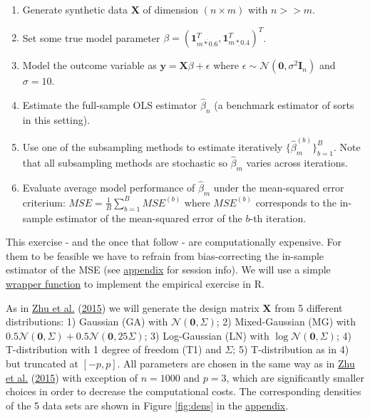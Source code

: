 \documentclass[
]{book}
\providecommand{\tightlist}{%
  \setlength{\itemsep}{0pt}\setlength{\parskip}{0pt}}
\begin{document}
\begin{enumerate}
\def\labelenumi{\arabic{enumi}.}
\tightlist
\item
  Generate synthetic data \(\mathbf{X}\) of dimension \((n \times m)\) with \(n>>m\).
\item
  Set some true model parameter \(\beta=(\mathbf{1}^T_{\overline{m*0.6}},\mathbf{1}^T_{\underline{m*0.4}})^T\).
\item
  Model the outcome variable as \(\mathbf{y}=\mathbf{X}\beta+\epsilon\) where \(\epsilon \sim \mathcal{N}(\mathbf{0},\sigma^2 \mathbf{I}_n)\) and \(\sigma=10\).
\item
  Estimate the full-sample OLS estimator \(\hat\beta_n\) (a benchmark estimator of sorts in this setting).
\item
  Use one of the subsampling methods to estimate iteratively \(\{\hat\beta^{(b)}_m\}^B_{b=1}\). Note that all subsampling methods are stochastic so \(\hat\beta_m\) varies across iterations.
\item
  Evaluate average model performance of \(\hat\beta_m\) under the mean-squared error criterium: \(MSE= \frac{1}{B} \sum_{b=1}^{B} MSE^{(b)}\) where \(MSE^{(b)}\) corresponds to the in-sample estimator of the mean-squared error of the \(b\)-th iteration.
\end{enumerate}

This exercise - and the once that follow - are computationally expensive. For them to be feasible we have to refrain from bias-correcting the in-sample estimator of the MSE (see \protect\hyperlink{app-session}{appendix} for session info). We will use a simple \href{R/sim_subsampling.R}{wrapper function} to implement the empirical exercise in R.

As in \protect\hyperlink{ref-zhu2015optimal}{Zhu et al.} (\protect\hyperlink{ref-zhu2015optimal}{2015}) we will generate the design matrix \(\mathbf{X}\) from 5 different distributions: 1) Gaussian (GA) with \(\mathcal{N}(\mathbf{0},\Sigma)\); 2) Mixed-Gaussian (MG) with \(0.5\mathcal{N}(\mathbf{0},\Sigma)+0.5\mathcal{N}(\mathbf{0},25\Sigma)\); 3) Log-Gaussian (LN) with \(\log\mathcal{N}(\mathbf{0},\Sigma)\); 4) T-distribution with 1 degree of freedom (T1) and \(\Sigma\); 5) T-distribution as in 4) but truncated at \([-p,p]\). All parameters are chosen in the same way as in \protect\hyperlink{ref-zhu2015optimal}{Zhu et al.} (\protect\hyperlink{ref-zhu2015optimal}{2015}) with exception of \(n=1000\) and \(p=3\), which are significantly smaller choices in order to decrease the computational costs. The corresponding densities of the 5 data sets are shown in Figure \ref{fig:dens} in the \protect\hyperlink{app-dens}{appendix}.
\end{document}

